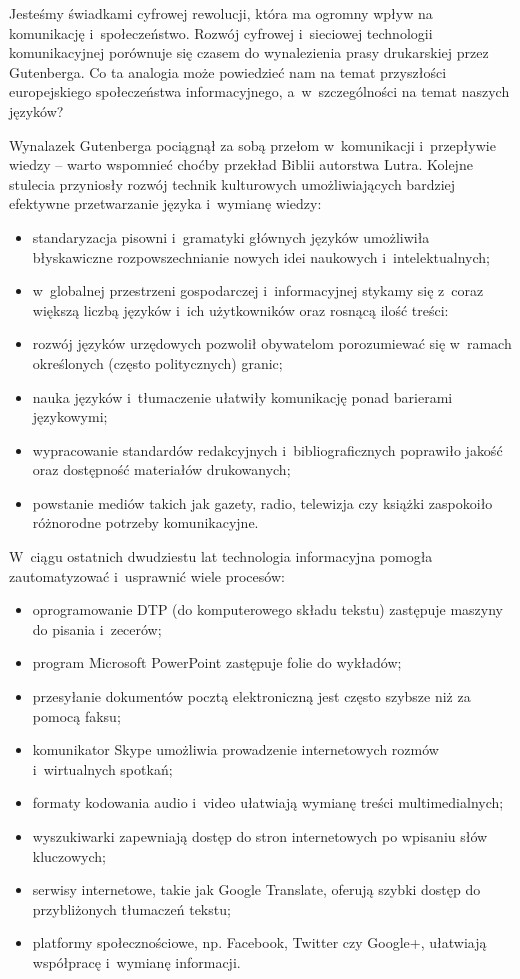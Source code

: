 \begin{multicols}{2} 

Jesteśmy świadkami cyfrowej rewolucji, która ma ogromny wpływ na
komunikację i~społeczeństwo. Rozwój cyfrowej i~sieciowej
technologii komunikacyjnej porównuje się czasem do wynalezienia
prasy drukarskiej przez Gutenberga. Co ta analogia może powiedzieć
nam na temat przyszłości europejskiego społeczeństwa
informacyjnego, a~w~szczególności na temat naszych języków? 


Wynalazek Gutenberga pociągnął za sobą przełom w~komunikacji
i~przepływie wiedzy – warto wspomnieć choćby przekład Biblii
autorstwa Lutra. Kolejne stulecia przyniosły rozwój technik
kulturowych umożliwiających bardziej efektywne przetwarzanie języka
i~wymianę wiedzy: \begin{itemize} \item standaryzacja pisowni
i~gramatyki głównych języków umożliwiła błyskawiczne
rozpowszechnianie nowych idei naukowych i~intelektualnych; \item
w~globalnej przestrzeni gospodarczej i~informacyjnej stykamy się
z~coraz większą liczbą języków i~ich użytkowników oraz
rosnącą ilość treści: \item rozwój języków urzędowych
pozwolił obywatelom porozumiewać się w~ramach określonych (często
politycznych) granic; \item nauka języków i~tłumaczenie ułatwiły
komunikację ponad barierami językowymi; \item wypracowanie
standardów redakcyjnych i~bibliograficznych poprawiło jakość oraz
dostępność materiałów drukowanych; \item powstanie mediów takich
jak gazety, radio, telewizja czy książki zaspokoiło różnorodne
potrzeby komunikacyjne. \end{itemize} W~ciągu ostatnich dwudziestu
lat technologia informacyjna pomogła zautomatyzować i~usprawnić
wiele procesów: \begin{itemize} \item oprogramowanie DTP (do
komputerowego składu tekstu) zastępuje maszyny do pisania
i~zecerów; \item program Microsoft PowerPoint zastępuje folie do
wykładów; \item przesyłanie dokumentów pocztą elektroniczną jest
często szybsze niż za pomocą faksu; \item komunikator Skype
umożliwia prowadzenie internetowych rozmów i~wirtualnych spotkań;
\item formaty kodowania audio i~video ułatwiają wymianę treści
multimedialnych; \item wyszukiwarki zapewniają dostęp do stron
internetowych po wpisaniu słów kluczowych; \item serwisy
internetowe, takie jak Google Translate, oferują szybki dostęp do
przybliżonych tłumaczeń tekstu; \item platformy społecznościowe,
np. Facebook, Twitter czy Google+, ułatwiają współpracę
i~wymianę informacji. \end{itemize} 


\end{multicols}
